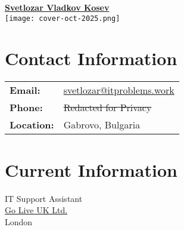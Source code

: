 \documentclass[letterpaper, 10pt]{article}
\newcommand{\redact}[1]{\textcolor{black!40}{#1}}
\begin{document}
	\pagestyle{empty} %
	
	\begin{center}
		\begin{minipage}[t]{0.5\textwidth}
			\centering
			\Large\textbf{\href{https://www.linkedin.com/in/svetlozar-kosev-m-sc-it-278058144/}{Svetlozar
					Vladkov Kosev}}\\[2ex]
			\texttt{[image: cover-oct-2025.png]}
		\end{minipage}%
		\begin{minipage}[t]{0.5\textwidth}
			\section*{Contact Information}
			\begin{tabular}{@{}l l}
				\textbf{Email:}   & \href{mailto:svetlozar@itproblems.work}{svetlozar@itproblems.work} \\
				\textbf{Phone:} & \redact{\st{Redacted for Privacy}} \\
				\textbf{Location:} & Gabrovo, Bulgaria                                                  \\
			\end{tabular}
			
			\section*{Current Information}
			IT Support Assistant \\ \href{https://www.goliveuk.com/}{Go Live UK Ltd.}
			\\ London \\
		\end{minipage}
	\end{center}
	
\end{document}
